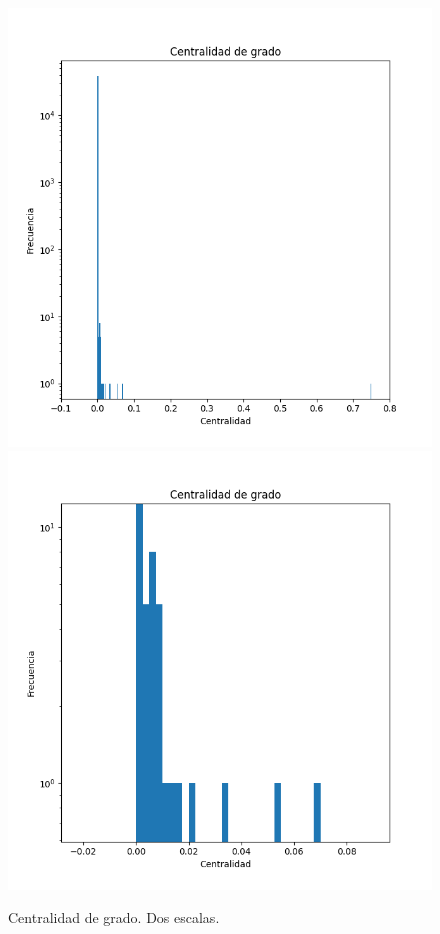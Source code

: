 \documentclass{article}
\begin{document}
    \begin{figure}
        \centering
        \includegraphics[scale=0.6]{degree_centrality.png}
        \includegraphics[scale=0.6]{degree_centrality_detail.png}
        \caption{Centralidad de grado. Dos escalas.}
        \label{fig:degcentr}
    \end{figure}
\end{document}
